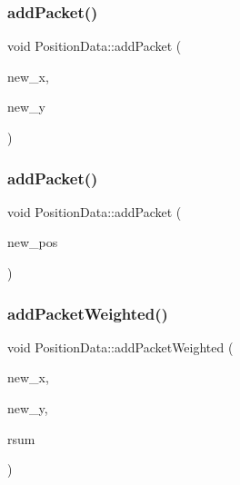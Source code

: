 \subsubsection{\texorpdfstring{add\+Packet()}{addPacket()}\hspace{0.1cm}{\footnotesize\ttfamily [1/2]}}
{\footnotesize\ttfamily void Position\+Data\+::add\+Packet (\begin{DoxyParamCaption}\item[{double}]{new\+\_\+x,  }\item[{double}]{new\+\_\+y }\end{DoxyParamCaption})}

\mbox{\label{class_position_data_a89d63ca49d6be83f882812001b83a682}} 
\subsubsection{\texorpdfstring{add\+Packet()}{addPacket()}\hspace{0.1cm}{\footnotesize\ttfamily [2/2]}}
{\footnotesize\ttfamily void Position\+Data\+::add\+Packet (\begin{DoxyParamCaption}\item[{\hyperlink{class_position_data}{Position\+Data}}]{new\+\_\+pos }\end{DoxyParamCaption})}

\mbox{\label{class_position_data_a6acc2e96cfaf138628c532986ee47de4}} 
\subsubsection{\texorpdfstring{add\+Packet\+Weighted()}{addPacketWeighted()}\hspace{0.1cm}{\footnotesize\ttfamily [1/2]}}
{\footnotesize\ttfamily void Position\+Data\+::add\+Packet\+Weighted (\begin{DoxyParamCaption}\item[{double}]{new\+\_\+x,  }\item[{double}]{new\+\_\+y,  }\item[{double}]{rsum }\end{DoxyParamCaption})}

